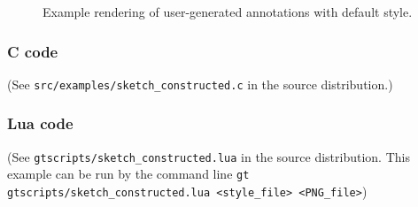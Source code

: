 \documentclass[a4paper]{scrreprt}
\begin{document}
\begin{figure}
\caption{Example rendering of user-generated annotations with default style.}
\label{constructed_img}
\end{figure}

\subsubsection{C code}
(See \texttt{src/examples/sketch\_constructed.c} in the source distribution.)

\subsubsection{Lua code}
(See \texttt{gtscripts/sketch\_constructed.lua} in the source distribution.  This example can be run by the command line \texttt{gt gtscripts/sketch\_constructed.lua <style\_file> <PNG\_file>})





\end{document}
